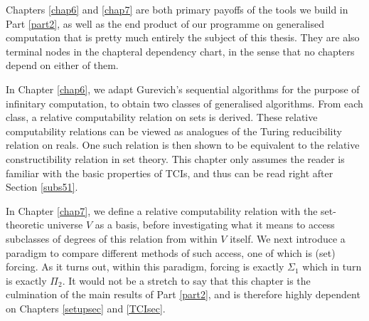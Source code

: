 \documentclass[12pt, twoside]{memoir}
\numberwithin{equation}{section}
\theoremstyle{definition}
\theoremstyle{remark}
\theoremstyle{definition}
\theoremstyle{definition}
\theoremstyle{definition}
\theoremstyle{remark}
\begin{document}
Chapters \ref{chap6} and \ref{chap7} are both primary payoffs of the tools we build in Part \ref{part2}, as well as the end product of our programme on generalised computation that is pretty much entirely the subject of this thesis. They are also terminal nodes in the chapteral dependency chart, in the sense that no chapters depend on either of them.

In Chapter \ref{chap6}, we adapt Gurevich's sequential algorithms for the purpose of infinitary computation, to obtain two classes of generalised algorithms. From each class, a relative computability relation on sets is derived. These relative computability relations can be viewed as analogues of the Turing reducibility relation on reals. One such relation is then shown to be equivalent to the relative constructibility relation in set theory. This chapter only assumes the reader is familiar with the basic properties of TCIs, and thus can be read right after Section \ref{subs51}.

In Chapter \ref{chap7}, we define a relative computability relation with the set-theoretic universe $V$ as a basis, before investigating what it means to access subclasses of degrees of this relation from within $V$ itself. We next introduce a paradigm to compare different methods of such access, one of which is (set) forcing. As it turns out, within this paradigm, forcing is exactly $\Sigma_1$ which in turn is exactly $\Pi_2$. It would not be a stretch to say that this chapter is the culmination of the main results of Part \ref{part2}, and is therefore highly dependent on Chapters \ref{setupsec} and \ref{TCIsec}.
\end{document}
